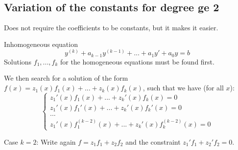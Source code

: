 \subsection{Variation of the constants for degree ge 2}

Does not require the coefficients to be constants, but it makes it easier.

Inhomogeneous equation \[ y^{(k)} + a_{k-1} y^{(k - 1)} + ... + a_1 y' + a_0 y = b \]
Solutions $f_1, ..., f_k$ for the homogeneous equations must be found first.

We then search for a solution of the form $f(x) = z_1(x) f_1(x) + ... + z_k(x) f_k(x)$, such that we have (for all $x$):
\[
    \begin{cases}
        z_1'(x) f_1(x) + ... + z_k'(x) f_k(x) = 0   \\
        z_1'(x) f_1'(x) + ... + z_k'(x) f_k'(x) = 0 \\
        ...                                         \\
        z_1'(x) f_1^{(k-2)}(x) + ... + z_k'(x) f_k^{(k-2)}(x) = 0
    \end{cases}
\]

\begin{example}
    Case $k = 2$: Write again $f = z_1 f_1 + z_2 f_2$ and the constraint $z_1' f_1 + z_2' f_2 = 0$.
\end{example}